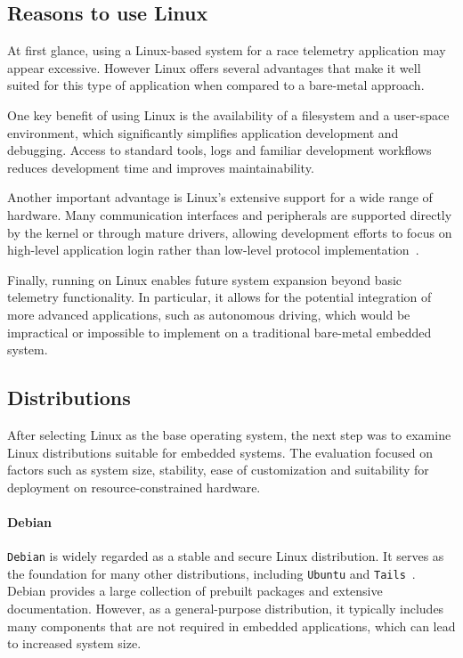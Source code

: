 \clearpage
\subsection{Reasons to use Linux}
At first glance, using a Linux-based system for a race telemetry application may appear excessive.
However Linux offers several advantages that make it well suited for this type of application when
compared to a bare-metal approach.

One key benefit of using Linux is the availability of a filesystem and a user-space environment, which
significantly simplifies application development and debugging. Access to standard tools, logs and familiar
development workflows reduces development time and improves maintainability.

Another important advantage is Linux's extensive support for a wide range of hardware.
Many communication interfaces and peripherals are supported directly by the kernel or through
mature drivers, allowing development efforts to focus on high-level application login rather than
low-level protocol implementation~\cite{jay-carlson-embedded-linux}.

Finally, running on Linux enables future system expansion beyond basic telemetry functionality. In particular,
it allows for the potential integration of more advanced applications, such as autonomous driving,
which would be impractical or impossible to implement on a traditional bare-metal embedded system.

\subsection{Distributions}

After selecting Linux as the base operating system, the next step was to examine Linux distributions
suitable for embedded systems. The evaluation focused on factors such as system size, stability,
ease of customization and suitability for deployment on resource-constrained hardware.

\paragraph{Debian}
\verb|Debian| is widely regarded as a stable and secure Linux distribution. It serves as the
foundation for many other distributions, including \verb|Ubuntu| and \verb|Tails|~\cite{reasons-to-use-debian}.
Debian provides a large collection of prebuilt packages and extensive documentation.
However, as a general-purpose distribution, it typically includes many components
that are not required in embedded applications, which can lead to increased system size.

